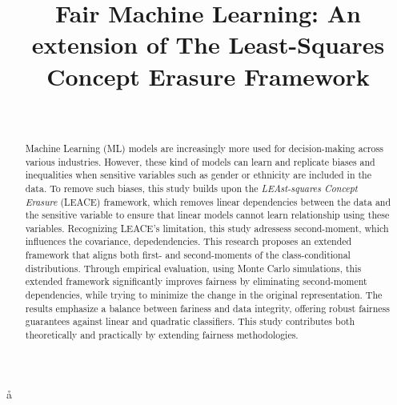 \documentclass[ecta,nameyear,final]{econsocart}
\numberwithin{equation}{section}
\theoremstyle{plain}
\theoremstyle{definition}
\begin{document}
å
\begin{frontmatter}

\title{Fair Machine Learning: An extension of The Least-Squares Concept Erasure Framework}

\begin{aug}
%
%
%
\author[add1]{~}
\address[add1]{%
,
}



\end{aug}

%

\begin{abstract}
    Machine Learning (ML) models are increasingly more used for decision-making across various industries. However, these kind of models can learn and replicate biases and inequalities when sensitive variables such as gender or ethnicity are included in the data. To remove such biases, this study builds upon the \emph{LEAst-squares Concept Erasure} (LEACE) framework, which removes linear dependencies between the data and the sensitive variable to ensure that linear models cannot learn relationship using these variables. Recognizing LEACE's limitation, this study adressess second-moment, which influences the covariance, depedendencies. This research proposes an extended framework that aligns both first- and second-moments of the class-conditional distributions. Through empirical evaluation, using Monte Carlo simulations, this extended framework significantly improves fairness by eliminating second-moment dependencies, while trying to minimize the change in the original representation. The results emphasize a balance between fariness and data integrity, offering robust fairness guarantees against linear and quadratic classifiers. This study contributes both theoretically and practically by extending fairness methodologies.
    \newpage
\end{abstract}



\end{frontmatter}
\end{document}
